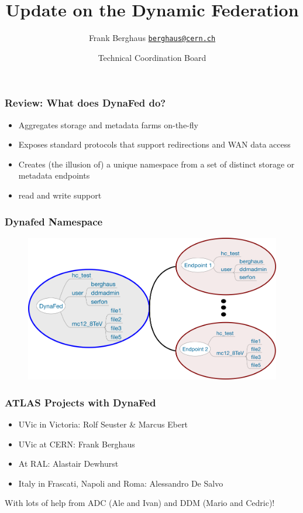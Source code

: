 \documentclass{beamer}
\title{Update on the Dynamic Federation}
\date[ISPN ’80]{Technical Coordination Board}
\author[Euclid]{Frank Berghaus \href{mailto:berghaus@cern.ch}{\texttt{berghaus@cern.ch}}}
\begin{document}
\begin{frame}
\titlepage
\end{frame}


\begin{frame}
\frametitle{Review: What does DynaFed do?}
\begin{itemize}
\item Aggregates storage and metadata farms on-the-fly
\item Exposes standard protocols that support redirections and WAN data access
\item Creates (the illusion of) a unique namespace from a set of distinct storage or metadata endpoints
\item read and write support
\end{itemize}
\end{frame}

\begin{frame}
  \frametitle{Dynafed Namespace}
  \begin{figure}
      \centering
      \includegraphics[width=\columnwidth]{dynafed-namespaces.png}
  \end{figure}
\end{frame}

\begin{frame}
  \frametitle{ATLAS Projects with DynaFed}
  \begin{itemize}
    \item UVic in Victoria: Rolf Seuster \& Marcus Ebert
    \item UVic at CERN: Frank Berghaus
    \item At RAL: Alastair Dewhurst
    \item Italy in Frascati, Napoli and Roma: Alessandro De Salvo
  \end{itemize}
  With lots of help from ADC (Ale and Ivan) and DDM (Mario and Cedric)!
\end{frame}
\end{document}
